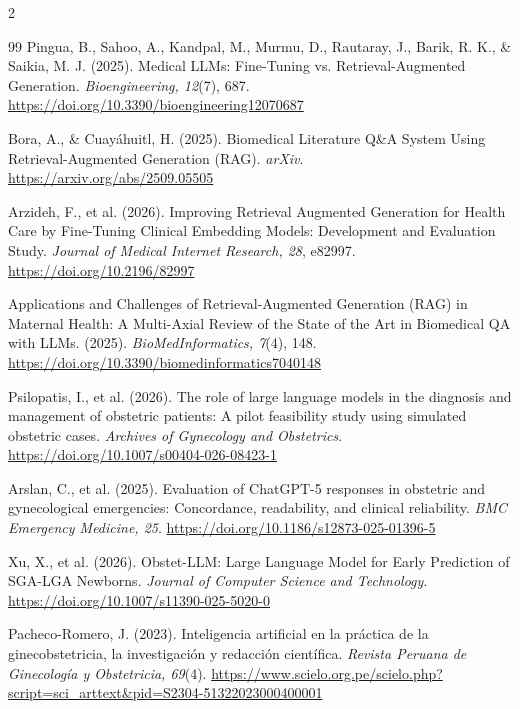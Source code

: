 \documentclass[11pt]{article}
\begin{document}
\newpage

\begin{multicols}{2}
\raggedright
\begin{thebibliography}{99}
     Pingua, B., Sahoo, A., Kandpal, M., Murmu, D., Rautaray, J., Barik, R. K., \& Saikia, M. J. (2025). Medical LLMs: Fine-Tuning vs. Retrieval-Augmented Generation. \textit{Bioengineering, 12}(7), 687. \url{https://doi.org/10.3390/bioengineering12070687}

     Bora, A., \& Cuay\'{a}huitl, H. (2025). Biomedical Literature Q\&A System Using Retrieval-Augmented Generation (RAG). \textit{arXiv}. \url{https://arxiv.org/abs/2509.05505}

     Arzideh, F., et al. (2026). Improving Retrieval Augmented Generation for Health Care by Fine-Tuning Clinical Embedding Models: Development and Evaluation Study. \textit{Journal of Medical Internet Research, 28}, e82997. \url{https://doi.org/10.2196/82997}

     Applications and Challenges of Retrieval-Augmented Generation (RAG) in Maternal Health: A Multi-Axial Review of the State of the Art in Biomedical QA with LLMs. (2025). \textit{BioMedInformatics, 7}(4), 148. \url{https://doi.org/10.3390/biomedinformatics7040148}

     Psilopatis, I., et al. (2026). The role of large language models in the diagnosis and management of obstetric patients: A pilot feasibility study using simulated obstetric cases. \textit{Archives of Gynecology and Obstetrics}. \url{https://doi.org/10.1007/s00404-026-08423-1}

     Arslan, C., et al. (2025). Evaluation of ChatGPT-5 responses in obstetric and gynecological emergencies: Concordance, readability, and clinical reliability. \textit{BMC Emergency Medicine, 25}. \url{https://doi.org/10.1186/s12873-025-01396-5}

     Xu, X., et al. (2026). Obstet-LLM: Large Language Model for Early Prediction of SGA-LGA Newborns. \textit{Journal of Computer Science and Technology}. \url{https://doi.org/10.1007/s11390-025-5020-0}

     Pacheco-Romero, J. (2023). Inteligencia artificial en la pr\'{a}ctica de la ginecobstetricia, la investigaci\'{o}n y redacci\'{o}n cient\'{i}fica. \textit{Revista Peruana de Ginecolog\'{i}a y Obstetricia, 69}(4). \url{https://www.scielo.org.pe/scielo.php?script=sci_arttext&pid=S2304-51322023000400001}


\end{thebibliography}
\end{multicols}
\end{document}
